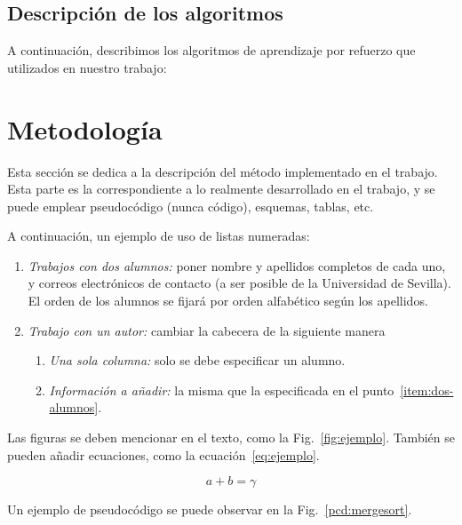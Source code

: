 \documentclass[conference,a4paper]{IEEEtran}
\def\figurename{Fig.}
\begin{document}
\subsection{Descripción de los algoritmos}

A continuación, describimos los algoritmos de aprendizaje por refuerzo que utilizados en nuestro trabajo:

\section{Metodología}

Esta sección se dedica a la descripción del método implementado en el trabajo.
Esta parte es la correspondiente a lo realmente desarrollado en el trabajo, y
se puede emplear pseudocódigo (nunca código), esquemas, tablas, etc.

A continuación, un ejemplo de uso de listas numeradas:
\begin{enumerate}
\item\label{item:dos-alumnos} \textit{Trabajos con dos alumnos:} poner nombre y
  apellidos completos de cada uno, y correos electrónicos de contacto (a ser
  posible de la Universidad de Sevilla). El orden de los alumnos se fijará por
  orden alfabético según los apellidos.
\item \textit{Trabajo con un autor:} cambiar la cabecera de la siguiente manera
  \begin{enumerate}
  \item \textit{Una sola columna:} solo se debe especificar un alumno.
  \item \textit{Información a añadir:} la misma que la especificada en el
    punto~\ref{item:dos-alumnos}.
  \end{enumerate}
\end{enumerate}

Las figuras se deben mencionar en el texto, como la
\figurename~\ref{fig:ejemplo}. También se pueden añadir ecuaciones, como la
ecuación~\eqref{eq:ejemplo}.

\begin{equation}
  \label{eq:ejemplo}
  a + b = \gamma
\end{equation}

Un ejemplo de pseudocódigo se puede observar en la
\figurename~\ref{pcd:mergesort}.
\end{document}
